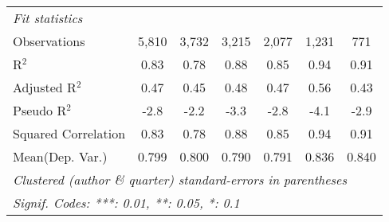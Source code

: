 \begin{tabular}{lcccccc}
   \midrule
   \emph{Fit statistics}\\
   Observations                                               & 5,810       & 3,732       & 3,215       & 2,077   & 1,231        & 771\\  
   R$^2$                                                      & 0.83        & 0.78        & 0.88        & 0.85    & 0.94         & 0.91\\  
   Adjusted R$^2$                                             & 0.47        & 0.45        & 0.48        & 0.47    & 0.56         & 0.43\\  
   Pseudo R$^2$                                               & -2.8        & -2.2        & -3.3        & -2.8    & -4.1         & -2.9\\  
   Squared Correlation                                        & 0.83        & 0.78        & 0.88        & 0.85    & 0.94         & 0.91\\  
Mean(Dep. Var.) & 0.799 & 0.800 & 0.790 & 0.791 & 0.836 & 0.840 \\
   \midrule \midrule
   \multicolumn{7}{l}{\emph{Clustered (author \& quarter) standard-errors in parentheses}}\\
   \multicolumn{7}{l}{\emph{Signif. Codes: ***: 0.01, **: 0.05, *: 0.1}}\\
\end{tabular}
\par\endgroup

